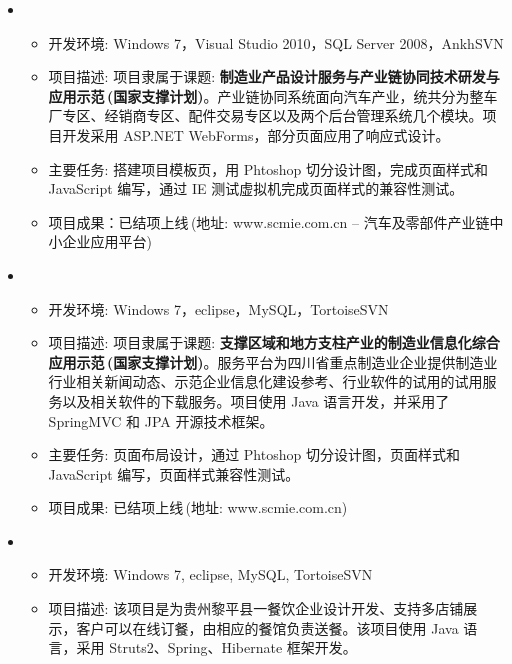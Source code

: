   \begin{itemize}[leftmargin=*]
    \item
      {\small
      \begin{itemize}
        \item 开发环境: Windows 7，Visual Studio 2010，SQL Server 2008，AnkhSVN
        \item 项目描述: 项目隶属于课题: \textbf{制造业产品设计服务与产业链协同技术研发与应用示范$\,$(国家支撑计划)}。产业链协同系统面向汽车产业，统共分为整车厂专区、经销商专区、配件交易专区以及两个后台管理系统几个模块。项目开发采用 ASP.NET WebForms，部分页面应用了响应式设计。
        \item 主要任务: 搭建项目模板页，用 Phtoshop 切分设计图，完成页面样式和 JavaScript 编写，通过 IE 测试虚拟机完成页面样式的兼容性测试。
        \item 项目成果：已结项上线$\,$(地址: www.scmie.com.cn -- 汽车及零部件产业链中小企业应用平台)
      \end{itemize}
      }
    \item
      {\small
      \begin{itemize}
        \item 开发环境: Windows 7，eclipse，MySQL，TortoiseSVN
        \item 项目描述: 项目隶属于课题: \textbf{支撑区域和地方支柱产业的制造业信息化综合应用示范$\,$(国家支撑计划)}。服务平台为四川省重点制造业企业提供制造业行业相关新闻动态、示范企业信息化建设参考、行业软件的试用的试用服务以及相关软件的下载服务。项目使用 Java 语言开发，并采用了 SpringMVC 和 JPA 开源技术框架。
        \item 主要任务: 页面布局设计，通过 Phtoshop 切分设计图，页面样式和 JavaScript 编写，页面样式兼容性测试。
        \item 项目成果: 已结项上线$\,$(地址: www.scmie.com.cn)
      \end{itemize}
      }
    \item
    {\small
    \begin{itemize}
      \item 开发环境: Windows 7, eclipse, MySQL, TortoiseSVN
      \item 项目描述: 该项目是为贵州黎平县一餐饮企业设计开发、支持多店铺展示，客户可以在线订餐，由相应的餐馆负责送餐。该项目使用 Java 语言，采用 Struts2、Spring、Hibernate 框架开发。

\end{itemize}}
\end{itemize}
